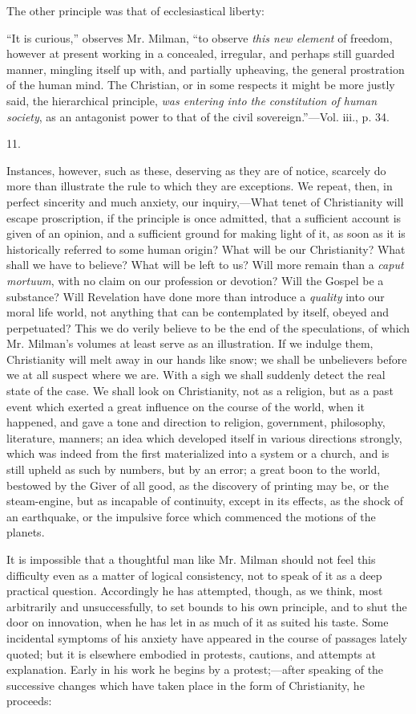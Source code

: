 The other principle was that of ecclesiastical
liberty:

``It is curious,'' observes Mr. Milman, ``to observe
\emph{this new element} of freedom, however at present working in a
concealed, irregular, and perhaps still guarded manner, mingling
itself up with, and partially upheaving, the general prostration of
the human mind. The Christian, or in some respects it might be more
justly said, the hierarchical principle, \emph{was entering into the
constitution of human society}, as an antagonist power to that of
the civil sovereign.''—Vol. iii., p. 34.

11.

Instances, however, such as these, deserving as
they are of notice, scarcely do more than illustrate the rule to which
they are exceptions. We repeat, then, in perfect sincerity and much
anxiety, our inquiry,—What tenet of Christianity will escape
proscription, if the principle is once admitted, that a sufficient
account is given of an opinion, and a sufficient ground for making
light of it, as soon as it is historically referred to some human
origin? What will be our Christianity? What shall we have to
believe? What will be left to us? Will more remain than a \emph{caput
mortuum}, with no claim on our profession or devotion? Will the
Gospel be a substance? Will Revelation have done more than introduce a
\emph{quality} into our moral life world, not anything that can be
contemplated by itself, obeyed and perpetuated? This we do verily
believe to be the end of the speculations, of which Mr. Milman's
volumes at least serve as an illustration. If we indulge them,
Christianity will melt away in our hands like snow; we shall be
unbelievers before we at all suspect where we are. With a sigh we
shall suddenly detect the real state of the case. We shall look on
Christianity, not as a religion, but as a past event which exerted a
great influence on the course of the world, when it happened, and gave
a tone and direction to religion, government, philosophy, literature,
manners; an idea which developed itself in various directions
strongly, which was indeed from the first materialized into a system
or a church, and is still upheld as such by numbers, but by an error;
a great boon to the world, bestowed by the Giver of all good, as the
discovery of printing may be, or the steam-engine, but as incapable of
continuity, except in its effects, as the shock of an earthquake, or
the impulsive force which commenced the motions of the planets.

It is impossible that a thoughtful man like Mr.
Milman should not feel this difficulty even as a matter of logical
consistency, not to speak of it as a deep practical question.
Accordingly he has attempted, though, as we think, most arbitrarily
and unsuccessfully, to set bounds to his own principle, and to shut
the door on innovation, when he has let in as much of it as suited his
taste. Some incidental symptoms of his anxiety have appeared in
the course of passages lately quoted; but it is elsewhere embodied in
protests, cautions, and attempts at explanation. Early in his work he
begins by a protest;—after speaking of the successive changes which
have taken place in the form of Christianity, he proceeds:

